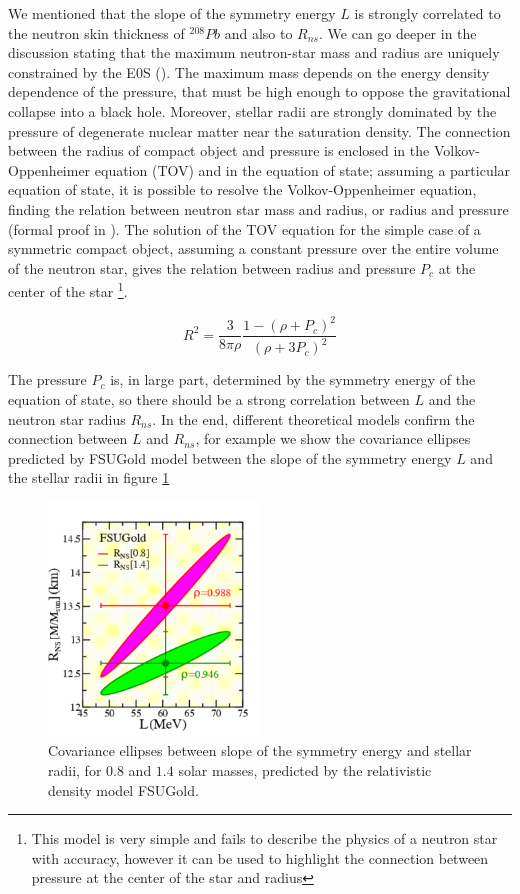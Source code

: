 We mentioned that the slope of the symmetry energy $L$ is strongly correlated to the neutron skin thickness of $^{208}Pb$ and also to $R_{ns}$. We can go deeper in the discussion stating that the maximum neutron-star mass and radius are uniquely constrained by the E0S (\cite{Lindblom1992DeterminingTN}). The maximum mass depends on the energy density dependence of the pressure, that must be high enough to oppose the gravitational collapse into a black hole. Moreover, stellar radii are strongly dominated by the pressure of degenerate nuclear matter near the saturation density.  
The connection between the radius of compact object and pressure is enclosed in the Volkov-Oppenheimer equation (TOV) and in the equation of state; assuming a particular equation of state, it is possible to resolve the Volkov-Oppenheimer equation, finding the relation between neutron star mass and radius, or radius and pressure (formal proof in \cite{LATTIMER_2007}). 
The solution of the TOV equation for the simple case of a symmetric compact object, assuming a constant pressure over the entire volume of the neutron star, gives the relation between radius and pressure $P_{c}$ at the center of the star \footnote{This model is very simple and fails to describe the physics of a neutron star with accuracy, however it can be used to highlight the connection between pressure at the center of the star and radius}.

\begin{equation}
R^{2} = \dfrac{3}{8\pi \rho} \dfrac{1 - (\rho + P_{c})^{2}}{(\rho + 3 P_{c})^{2}}
\end{equation}

The pressure $P_{c}$ is, in large part, determined by the symmetry energy of the equation of state, so there should be a strong correlation between $L$ and the neutron star radius $R_{ns}$. In the end, different theoretical models \cite{PhysRevLett.95.122501} confirm the connection between $L$ and $R_{ns}$, for example we show the covariance ellipses predicted by FSUGold model between the slope of the symmetry energy $L$ and the stellar radii in figure \ref{fig:LvsRns}

\begin{figure}[hbtp]
\centering
\includegraphics[width = 0.5\textwidth]{Introduzione/LvsRns.pdf}
\caption{Covariance ellipses between slope of the symmetry energy and stellar radii, for $0.8$ and $1.4$ solar masses, predicted by the relativistic density model FSUGold.}
\label{fig:LvsRns}
\end{figure}

